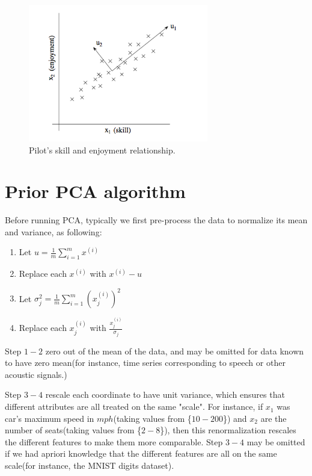 \documentclass[a4paper]{article}
\begin{document}
\begin{figure}[h]
\centering
\includegraphics[width=0.7\textwidth]{./images/pilot_example.png}
\caption{\label{fig:pilot} Pilot's skill and enjoyment relationship.}
\end{figure}

\section{Prior PCA algorithm}

Before running PCA, typically we first pre-process the data to normalize its mean and variance, as following:

\begin{enumerate}
\item Let $u = \frac{1}{m} \sum_{i=1}^{m} x^{(i)}$
    \item Replace each $x^{(i)}$ with $x^{(i)} - u$
    \item Let $\sigma_j^2 = \frac{1}{m} \sum_{i=1}^{m} (x_j^{(i)})^2$
    \item Replace each $x_j^{(i)}$ with $\frac{x_j^{(i)}}{\sigma_j}$
\end{enumerate}

Step $1-2$ zero out of the mean of the data, and may be omitted for data known to have zero mean(for instance, time series corresponding to speech or other acoustic signals.) 

Step $3-4$ rescale each coordinate to have unit variance, which ensures that different attributes are all treated on the same "scale". For instance, if $x_1$ was car's maximum speed in $mph$(taking values from \{$10-200$\}) and $x_2$ are the number of seats(taking values from \{$2-8$\}), then this renormalization rescales the different features to make them more comparable. Step $3-4$ may be omitted if we had apriori knowledge that the different features are all on the same scale(for instance, the MNIST digits dataset).
\end{document}

